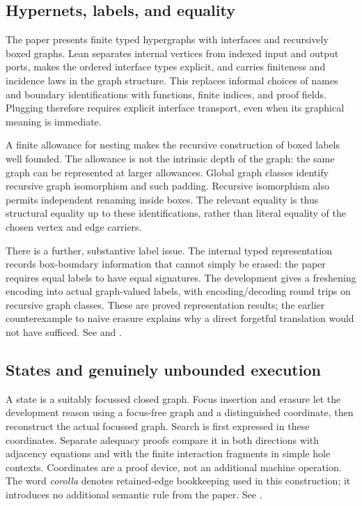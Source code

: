 \subsection{Hypernets, labels, and equality}

The paper presents finite typed hypergraphs with interfaces and recursively
boxed graphs. Lean separates internal vertices from indexed input and output
ports, makes the ordered interface types explicit, and carries finiteness and
incidence laws in the graph structure. This replaces informal choices of
names and boundary identifications with functions, finite indices, and proof
fields. Plugging therefore requires explicit interface transport, even when
its graphical meaning is immediate.

A finite allowance for nesting makes the recursive construction of boxed
labels well founded. The allowance is not the intrinsic depth of the graph:
the same graph can be represented at larger allowances. Global graph classes
identify recursive graph isomorphism and such padding. Recursive isomorphism
also permits independent renaming inside boxes. The relevant equality is thus
structural equality up to these identifications, rather than literal equality
of the chosen vertex and edge carriers.

There is a further, substantive label issue. The internal typed representation
records box-boundary information that cannot simply be erased: the paper
requires equal labels to have equal signatures. The development gives a
freshening encoding into actual graph-valued labels, with encoding/decoding
round trips on recursive graph classes. These are proved representation
results; the earlier counterexample to naive erasure explains why a direct
forgetful translation would not have sufficed.
See  and
.

\subsection{States and genuinely unbounded execution}

A state is a suitably focussed closed graph. Focus insertion and erasure let
the development reason using a focus-free graph and a distinguished coordinate,
then reconstruct the actual focussed graph. Search is first expressed in
these coordinates. Separate adequacy proofs compare it in both directions
with adjacency equations and with the finite interaction fragments in simple
hole contexts. Coordinates are a proof device, not an additional machine
operation. The word \emph{corolla} denotes retained-edge bookkeeping used in
this construction; it introduces no additional semantic rule from the paper.
See .

